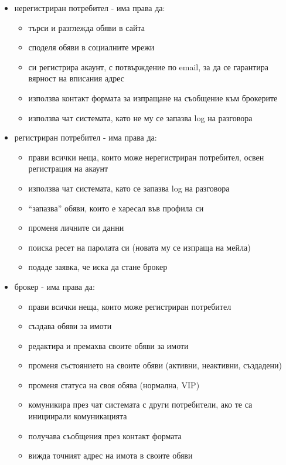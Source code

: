 \documentclass[]{article}
\begin{document}
\begin{enumerate}[I.]
{\begin{enumerate}[1.]
{				\begin{itemize}
					\item {нерегистриран потребител - има права да:
						\begin{itemize}
							\item търси и разглежда обяви в сайта
							\item споделя обяви в социалните мрежи
							\item си регистрира акаунт, с потвърждение по email, за да се гарантира вярност на вписания адрес
							\item използва контакт формата за изпращане на съобщение към брокерите
							\item използва чат системата, като не му се запазва log на разговора
						\end{itemize}
					}
					\item {регистриран потребител - има права да:
						\begin{itemize}
							\item прави всички неща, които може нерегистриран потребител, освен регистрация на акаунт
							\item използва чат системата, като се запазва log на разговора
							\item ``запазва'' обяви, които е харесал във профила си
							\item променя личните си данни
							\item поиска ресет на паролата си (новата му се изпраща на мейла)
							\item подаде заявка, че иска да стане брокер
						\end{itemize}
					}
					\item {брокер - има права да:
						\begin{itemize}
							\item прави всички неща, които може регистриран потребител
							\item създава обяви за имоти
							\item редактира и премахва своите обяви за имоти
							\item променя състоянието на своите обяви (активни, неактивни, създадени)
							\item променя статуса на своя обява (нормална, VIP)
							\item комуникира през чат системата с други потребители, ако те са инициирали комуникацията
							\item получава съобщения през контакт формата
							\item вижда точният адрес на имота в своите обяви

\end{itemize}}
\end{itemize}}
\end{enumerate}}
\end{enumerate}
\end{document}
